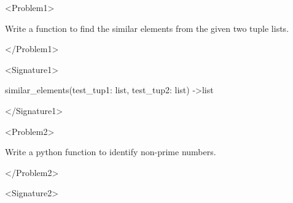 \begin{tcolorbox}[
    colback=gray!10,           %
    colframe=gray!75,          %
    title=Prompt for Generating Function Signature,      %
    fonttitle=\bfseries,       %
    width=\textwidth,          %
    sharp corners,             %
    boxrule=0.75mm,            %
    coltitle=black             %
]
\textless Problem1\textgreater

Write a function to find the similar elements from the given two tuple lists.

\textless /Problem1\textgreater

\textless Signature1\textgreater

similar\_elements(test\_tup1: list, test\_tup2: list) -\textgreater list

\textless/Signature1\textgreater

\textless Problem2\textgreater

Write a python function to identify non-prime numbers.

\textless/Problem2\textgreater

\textless Signature2\textgreater
\end{tcolorbox}

